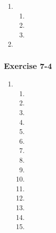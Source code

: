 \begin{multicols}{3}
\begin{enumerate}[noitemsep, label=\textbf{\arabic*}. ]
\item %

     \begin{enumerate}[noitemsep, label=\textbf{(\alph*)} ]
    \item %
    \item %
    \item %
    \end{enumerate}

\item %

\end{enumerate}

\subsubsection*{Exercise 7-4} %
   \begin{enumerate}[noitemsep, label=\textbf{\arabic*}. ] 
\item %
    \begin{enumerate}[noitemsep, label=\textbf{(\alph*)} ]
 \item %
\item %
\item %
\item %
\item %
\item %
\item %
\item %
\item %
\item %
\item %
\item %
\item %
\item %
\item %
\end{enumerate}


\end{enumerate}
\end{multicols}
